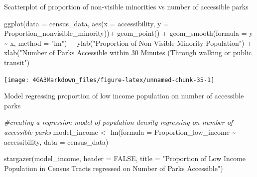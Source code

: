 \documentclass[
]{article}
\newenvironment{Shaded}{\begin{snugshade}}{\end{snugshade}}
\newcommand{\AttributeTok}[1]{\textcolor[rgb]{0.77,0.63,0.00}{#1}}
\newcommand{\CommentTok}[1]{\textcolor[rgb]{0.56,0.35,0.01}{\textit{#1}}}
\newcommand{\ConstantTok}[1]{\textcolor[rgb]{0.00,0.00,0.00}{#1}}
\newcommand{\FunctionTok}[1]{\textcolor[rgb]{0.00,0.00,0.00}{#1}}
\newcommand{\NormalTok}[1]{#1}
\newcommand{\OtherTok}[1]{\textcolor[rgb]{0.56,0.35,0.01}{#1}}
\newcommand{\SpecialCharTok}[1]{\textcolor[rgb]{0.00,0.00,0.00}{#1}}
\newcommand{\StringTok}[1]{\textcolor[rgb]{0.31,0.60,0.02}{#1}}
\begin{document}
Scatterplot of proportion of non-visible minorities vs number of
accessible parks

\begin{Shaded}
\begin{Highlighting}[]
\FunctionTok{ggplot}\NormalTok{(}\AttributeTok{data =}\NormalTok{ census\_data, }
       \FunctionTok{aes}\NormalTok{(}\AttributeTok{x =}\NormalTok{ accessibility, }
           \AttributeTok{y =}\NormalTok{ Proportion\_nonvisible\_minority))}\SpecialCharTok{+}
  \FunctionTok{geom\_point}\NormalTok{() }\SpecialCharTok{+}
  \FunctionTok{geom\_smooth}\NormalTok{(}\AttributeTok{formula =}\NormalTok{ y }\SpecialCharTok{\textasciitilde{}}\NormalTok{ x,}
              \AttributeTok{method =} \StringTok{"lm"}\NormalTok{) }\SpecialCharTok{+}
  \FunctionTok{ylab}\NormalTok{(}\StringTok{"Proportion of Non{-}Visible Minority Population"}\NormalTok{) }\SpecialCharTok{+}
  \FunctionTok{xlab}\NormalTok{(}\StringTok{"Number of Parks Accessible within 30 Minutes (Through walking or public transit"}\NormalTok{) }
\end{Highlighting}
\end{Shaded}

\begin{center}\texttt{[image: 4GA3Markdown\_files/figure-latex/unnamed-chunk-35-1]} \end{center}

Model regressing proportion of low income population on number of
accessible parks

\begin{Shaded}
\begin{Highlighting}[]
\CommentTok{\#creating a regression model of population density regressing on number of accessible parks}
\NormalTok{model\_income }\OtherTok{\textless{}{-}} \FunctionTok{lm}\NormalTok{(}\AttributeTok{formula =}\NormalTok{ Proportion\_low\_income }\SpecialCharTok{\textasciitilde{}}\NormalTok{ accessibility, }
             \AttributeTok{data =}\NormalTok{ census\_data)}

\FunctionTok{stargazer}\NormalTok{(model\_income,}
          \AttributeTok{header =} \ConstantTok{FALSE}\NormalTok{,}
          \AttributeTok{title =} \StringTok{"Proportion of Low Income Population in Census Tracts regressed on Number of Parks Accessible"}\NormalTok{)}
\end{Highlighting}
\end{Shaded}
\end{document}
